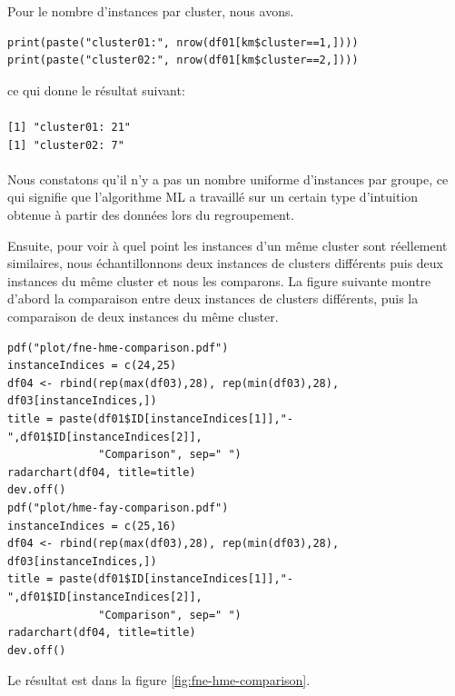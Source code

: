 \documentclass[11pt]{article}
\begin{document}
Pour le nombre d'instances par cluster, nous avons.
\begin{verbatim}
print(paste("cluster01:", nrow(df01[km$cluster==1,])))
print(paste("cluster02:", nrow(df01[km$cluster==2,])))
\end{verbatim}
ce qui donne le résultat suivant:\\\\
\texttt{[1] "cluster01: 21"}\\
\texttt{[1] "cluster02: 7"}\\\\
Nous constatons qu'il n'y a pas un nombre uniforme d'instances par groupe, ce
qui signifie que l'algorithme ML a travaillé sur un certain type d'intuition
obtenue à partir des données lors du regroupement.\par Ensuite, pour voir à quel
point les instances d'un même cluster sont réellement similaires, nous
échantillonnons deux instances de clusters différents puis deux instances du
même cluster et nous les comparons. La figure suivante montre d'abord la
comparaison entre deux instances de clusters différents, puis la comparaison de
deux instances du même cluster.\par
\begin{verbatim}
pdf("plot/fne-hme-comparison.pdf")
instanceIndices = c(24,25)
df04 <- rbind(rep(max(df03),28), rep(min(df03),28), df03[instanceIndices,])
title = paste(df01$ID[instanceIndices[1]],"-",df01$ID[instanceIndices[2]],
              "Comparison", sep=" ")
radarchart(df04, title=title)
dev.off()
pdf("plot/hme-fay-comparison.pdf")
instanceIndices = c(25,16)
df04 <- rbind(rep(max(df03),28), rep(min(df03),28), df03[instanceIndices,])
title = paste(df01$ID[instanceIndices[1]],"-",df01$ID[instanceIndices[2]],
              "Comparison", sep=" ")
radarchart(df04, title=title)
dev.off()
\end{verbatim}
Le résultat est dans la figure \ref{fig:fne-hme-comparison}.\par
\end{document}
